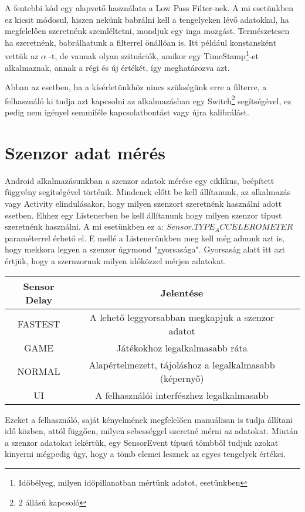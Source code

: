\documentclass{thesis-ekf}
\theoremstyle{definition}
\theoremstyle{remark}
\begin{document}
\par A fentebbi kód egy alapvető használata a Low Pass Filter-nek. A mi esetünkben ez kicsit módosul, hiszen nekünk babrálni kell a tengelyeken lévő adatokkal, ha megfelelően szeretnénk szemléltetni, mondjuk egy inga mozgást. Természetesen ha szeretnénk, babrálhatunk a filterrel önállóan is. Itt például konstansként vettük az $\alpha$ -t, de vannak olyan szituációk, amikor egy TimeStamp\footnote{Időbélyeg, milyen időpillanatban mértünk adatot, esetünkben}-et alkalmaznak, annak a régi és új értékét, így meghatározva azt.
\par Abban az esetben, ha a kísérletünkhöz nincs szükségünk erre a filterre, a felhasználó ki tudja azt kapcsolni az alkalmazásban egy Switch\footnote{2 állású kapcsoló} segítségével, ez pedig nem igényel semmiféle kapcsolatbontást vagy újra kalibrálást.
\section{Szenzor adat mérés}
Android alkalmazásunkban a szenzor adatok mérése egy ciklikus, beépített függvény segítségével történik. Mindenek előtt be kell állítanunk, az alkalmazás vagy Activity elindulásakor, hogy milyen szenzort szeretnénk használni adott esetben. Ehhez egy Listenerben be kell állítanunk hogy milyen szenzor típust szeretnénk használni. A mi esetünkben ez a: $Sensor.TYPE_ACCELEROMETER$ paraméterrel érhető el. E mellé a Listenerünkben meg kell még adnunk azt is, hogy mekkora legyen a szenzor úgymond "gyorsasága". Gyorsaság alatt itt azt értjük, hogy a szernzorunk milyen időközzel mérjen adatokat.
\begin{center}
	\begin{tabular}{ |c|c|c| } 
		\hline
		Sensor Delay & Jelentése\\
		\hline\hline
		FASTEST & A lehető leggyorsabban megkapjuk a szenzor adatot  \\
		\hline
		GAME & Játékokhoz legalkalmasabb ráta\\
		\hline
		NORMAL & Alapértelmezett, tájoláshoz a legalkalmasabb (képernyő) \\
		\hline
		UI & A felhasználói interfészhez legalkalmasabb \\
		\hline
	\end{tabular}
\end{center}
\par Ezeket a felhasználó, saját kényelmének megfelelően manuálisan is tudja állítani idő közben, attól függően, milyen sebességgel szeretné mérni az adatokat. Miután a szenzor adatokat lekértük, egy SensorEvent típusú tömbből tudjuk azokat kinyerni mégpedig úgy, hogy a tömb elemei lesznek az egyes tengelyek értékei.
\end{document}
